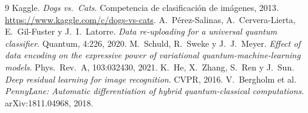 \documentclass[11pt,letterpaper]{article}
\begin{document}
\begin{thebibliography}{9}
 Kaggle. \emph{Dogs vs.\ Cats}. Competencia de clasificación de imágenes,
2013. \url{https://www.kaggle.com/c/dogs-vs-cats}.
 A.\ Pérez-Salinas, A.\ Cervera-Lierta, E.\ Gil-Fuster y J.\ I.\ Latorre.
\emph{Data re-uploading for a universal quantum classifier}. Quantum, 4:226, 2020.
 M.\ Schuld, R.\ Sweke y J.\ J.\ Meyer. \emph{Effect of data encoding on the
expressive power of variational quantum-machine-learning models}. Phys.\ Rev.\ A, 103:032430, 2021.
 K.\ He, X.\ Zhang, S.\ Ren y J.\ Sun. \emph{Deep residual learning for image
recognition}. CVPR, 2016.
 V.\ Bergholm et al. \emph{PennyLane: Automatic differentiation of hybrid
quantum-classical computations}. arXiv:1811.04968, 2018.
\end{thebibliography}
\end{document}
